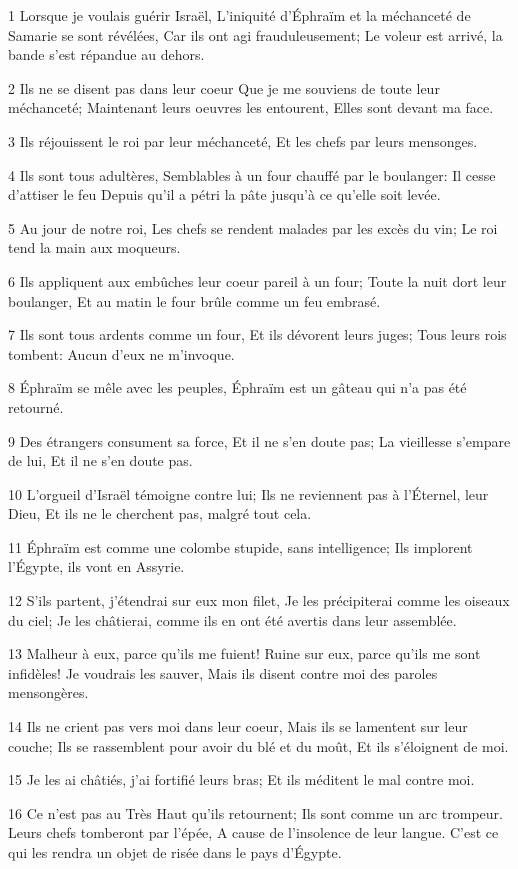 \par 1 Lorsque je voulais guérir Israël, L'iniquité d'Éphraïm et la méchanceté de Samarie se sont révélées, Car ils ont agi frauduleusement; Le voleur est arrivé, la bande s'est répandue au dehors.
\par 2 Ils ne se disent pas dans leur coeur Que je me souviens de toute leur méchanceté; Maintenant leurs oeuvres les entourent, Elles sont devant ma face.
\par 3 Ils réjouissent le roi par leur méchanceté, Et les chefs par leurs mensonges.
\par 4 Ils sont tous adultères, Semblables à un four chauffé par le boulanger: Il cesse d'attiser le feu Depuis qu'il a pétri la pâte jusqu'à ce qu'elle soit levée.
\par 5 Au jour de notre roi, Les chefs se rendent malades par les excès du vin; Le roi tend la main aux moqueurs.
\par 6 Ils appliquent aux embûches leur coeur pareil à un four; Toute la nuit dort leur boulanger, Et au matin le four brûle comme un feu embrasé.
\par 7 Ils sont tous ardents comme un four, Et ils dévorent leurs juges; Tous leurs rois tombent: Aucun d'eux ne m'invoque.
\par 8 Éphraïm se mêle avec les peuples, Éphraïm est un gâteau qui n'a pas été retourné.
\par 9 Des étrangers consument sa force, Et il ne s'en doute pas; La vieillesse s'empare de lui, Et il ne s'en doute pas.
\par 10 L'orgueil d'Israël témoigne contre lui; Ils ne reviennent pas à l'Éternel, leur Dieu, Et ils ne le cherchent pas, malgré tout cela.
\par 11 Éphraïm est comme une colombe stupide, sans intelligence; Ils implorent l'Égypte, ils vont en Assyrie.
\par 12 S'ils partent, j'étendrai sur eux mon filet, Je les précipiterai comme les oiseaux du ciel; Je les châtierai, comme ils en ont été avertis dans leur assemblée.
\par 13 Malheur à eux, parce qu'ils me fuient! Ruine sur eux, parce qu'ils me sont infidèles! Je voudrais les sauver, Mais ils disent contre moi des paroles mensongères.
\par 14 Ils ne crient pas vers moi dans leur coeur, Mais ils se lamentent sur leur couche; Ils se rassemblent pour avoir du blé et du moût, Et ils s'éloignent de moi.
\par 15 Je les ai châtiés, j'ai fortifié leurs bras; Et ils méditent le mal contre moi.
\par 16 Ce n'est pas au Très Haut qu'ils retournent; Ils sont comme un arc trompeur. Leurs chefs tomberont par l'épée, A cause de l'insolence de leur langue. C'est ce qui les rendra un objet de risée dans le pays d'Égypte.

